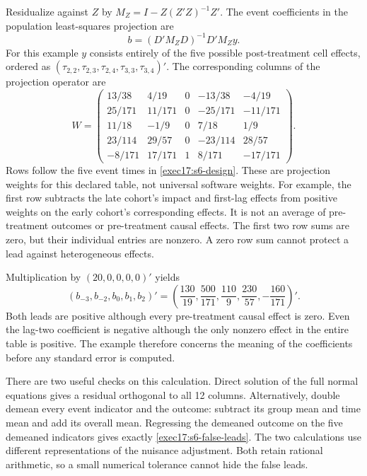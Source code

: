 Residualize against $Z$ by $M_Z=I-Z(Z'Z)^{-1}Z'$. The event coefficients
in the population least-squares projection are
\begin{equation}
 b=(D'M_ZD)^{-1}D'M_Zy.
 \label{exec17:s6-fwl}
\end{equation}
For this example $y$ consists entirely of the five possible post-treatment
cell effects, ordered as
$(\tau_{2,2},\tau_{2,3},\tau_{2,4},\tau_{3,3},\tau_{3,4})'$.
The corresponding columns of the projection operator are
\begin{equation}
 W=
 \begin{pmatrix}
 13/38&4/19&0&-13/38&-4/19\\
 25/171&11/171&0&-25/171&-11/171\\
 11/18&-1/9&0&7/18&1/9\\
 23/114&29/57&0&-23/114&28/57\\
 -8/171&17/171&1&8/171&-17/171
 \end{pmatrix}.
 \label{exec17:s6-projection}
\end{equation}
Rows follow the five event times in \eqref{exec17:s6-design}. These are
projection weights for this declared table, not universal software weights.
For example, the first row subtracts the late cohort's impact and first-lag
effects from positive weights on the early cohort's corresponding effects.
It is not an average of pre-treatment outcomes or pre-treatment causal
effects. The first two row sums are zero, but their individual entries are
nonzero. A zero row sum cannot protect a lead against heterogeneous effects.

Multiplication by $(20,0,0,0,0)'$ yields
\begin{equation}
 (b_{-3},b_{-2},b_0,b_1,b_2)'
 =\left(\frac{130}{19},\frac{500}{171},
          \frac{110}{9},\frac{230}{57},-\frac{160}{171}\right)'.
 \label{exec17:s6-false-leads}
\end{equation}
Both leads are positive although every pre-treatment causal effect is zero.
Even the lag-two coefficient is negative although the only nonzero effect
in the entire table is positive. The example therefore concerns the meaning
of the coefficients before any standard error is computed.

There are two useful checks on this calculation. Direct solution of the full
normal equations gives a residual orthogonal to all 12 columns. Alternatively,
double demean every event indicator and the outcome: subtract its group
mean and time mean and add its overall mean. Regressing the demeaned outcome
on the five demeaned indicators gives exactly
\eqref{exec17:s6-false-leads}. The two calculations use different
representations of the nuisance adjustment. Both retain rational arithmetic,
so a small numerical tolerance cannot hide the false leads.~\citep{exec17_s6_math}

